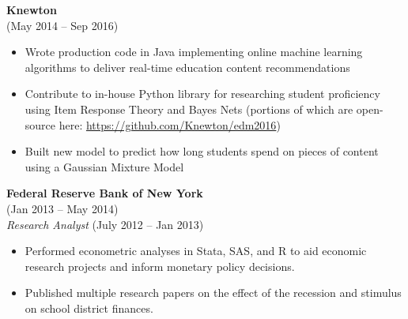 \documentclass{res}
\begin{document}
\begin{resume}
  {\bf Knewton} \\ 
   \hspace{3pt} (May 2014 -- Sep 2016)
  \vspace{2pt}
  \begin{itemize} \itemsep 2.0pt %
  \item Wrote production code in Java implementing online machine learning algorithms to deliver real-time education content recommendations
  \item Contribute to in-house Python library for researching student proficiency using Item Response Theory and Bayes Nets (portions of which are open-source here: \href{https://github.com/Knewton/edm2016}{https://github.com/Knewton/edm2016})
  \item Built new model to predict how long students spend on pieces of content using a Gaussian Mixture Model
    
  \end{itemize}

  {\bf Federal Reserve Bank of New York}  \\
   \hspace{3pt} (Jan 2013 -- May 2014)\\
        {\it Research Analyst} \hspace{20pt} (July 2012 -- Jan 2013)
        \vspace{2pt}
  \begin{itemize} \itemsep 2.0pt %
  \item Performed econometric analyses in Stata, SAS, and R to aid economic research projects and inform monetary policy decisions.
  \item Published multiple research papers on the effect of the recession and stimulus on school district finances.
  \end{itemize}
  

\end{resume}
\end{document}
